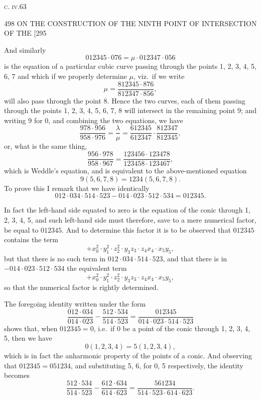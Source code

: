 \documentclass[11pt]{article}
\begin{document}
\medskip
\hfill\textsc{c. iv.}\hfill 63\hfill\hfill

\newpage
\begin{center}
498 \hfill ON THE CONSTRUCTION OF THE NINTH POINT OF INTERSECTION OF THE \hfill \textsc{[295}
\end{center}

And similarly
\[ 012345 \cdot 076 = \mu\cdot 012347\cdot 056 \]
is the equation of a particular cubic curve passing through the points 1, 2, 3, 4, 5, 6, 7
and which if we properly determine $\mu$, viz.\ if we write
\[ \mu = \dfrac{812345\cdot 876}{812347\cdot 856}, \]
will also pass through the point 8. Hence the two curves, each of them passing
through the points 1, 2, 3, 4, 5, 6, 7, 8 will intersect in the remaining point 9; and
writing 9 for 0, and combining the two equations, we have
\[ \dfrac{978\cdot 956}{958\cdot 976} = \dfrac{\lambda}{\mu} = \dfrac{612345}{612347}\cdot\dfrac{812347}{812345}, \]
or, what is the same thing,
\[ \dfrac{956\cdot 978}{958\cdot 967} = \dfrac{123456\cdot 123478}{123458\cdot 123467}, \]
which is Weddle's equation, and is equivalent to the above-mentioned equation
\[ 9(5,6,7,8) = 1234(5,6,7,8). \]
To prove this I remark that we have identically
\[ 012\cdot 034\cdot 514\cdot 523-014\cdot 023\cdot 512\cdot 534 = 012345. \]

In fact the left-hand side equated to zero is the equation of the conic through
1, 2, 3, 4, 5, and such left-hand side must therefore, save to a mere numerical factor,
be equal to $012345$. And to determine this factor it is to be observed that $012345$
contains the term
\[ +x_{0}^{2}\cdot y_{1}^{2}\cdot z_{2}^{2}\cdot y_{3}z_{3}\cdot z_{4}x_{4}\cdot x_{5}y_{5}, \]
but that there is no such term in $012\cdot 034\cdot 514\cdot 523$, and that there is in $-014\cdot 023\cdot 512\cdot 534$
the equivalent term
\[ +x_{0}^{2}\cdot y_{1}^{2}\cdot z_{2}^{2}\cdot y_{3}z_{3}\cdot z_{4}x_{4}\cdot x_{5}y_{5}, \]
so that the numerical factor is rightly determined.

The foregoing identity written under the form
\[ \dfrac{012\cdot 034}{014\cdot 023}-\dfrac{512\cdot 534}{514\cdot 523} = \dfrac{012345}{014\cdot 023\cdot 514\cdot 523} \]
shows that, when $012345=0$, i.e.\ if 0 be a point of the conic through 1, 2, 3, 4, 5,
then we have
\[ 0(1,2,3,4) = 5(1,2,3,4), \]
which is in fact the anharmonic property of the points of a conic. And observing
that $012345 = 051234$, and substituting 5, 6, for 0, 5 respectively, the identity becomes
\[ \dfrac{512\cdot 534}{514\cdot 523}-\dfrac{612\cdot 634}{614\cdot 623} = \dfrac{561234}{514\cdot 523\cdot 614\cdot 623}. \]
\end{document}
